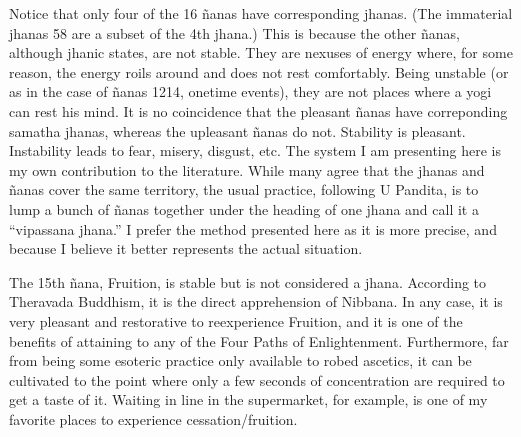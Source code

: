\documentclass[a5paper,10pt,english]{book}
\begin{document}
\sphinxAtStartPar
Notice that only four of the 16 ñanas have corresponding jhanas. (The
immaterial jhanas 5\sphinxhyphen{}8 are a subset of the 4th jhana.) This is because
the other ñanas, although jhanic states, are not stable. They are
nexuses of energy where, for some reason, the energy roils around and
does not rest comfortably. Being unstable (or as in the case of ñanas
12\sphinxhyphen{}14, one\sphinxhyphen{}time events), they are not places where a yogi can rest his
mind. It is no coincidence that the pleasant ñanas have correponding
samatha jhanas, whereas the upleasant ñanas do not. Stability is
pleasant. Instability leads to fear, misery, disgust, etc. The system I
am presenting here is my own contribution to the literature. While many
agree that the jhanas and ñanas cover the same territory, the usual
practice, following U Pandita, is to lump a bunch of ñanas together
under the heading of one jhana and call it a “vipassana jhana.” I prefer
the method presented here as it is more precise, and because I believe
it better represents the actual situation.

\sphinxAtStartPar
The 15th ñana, Fruition, is stable but is not considered a jhana.
According to Theravada Buddhism, it is the direct apprehension of
Nibbana. In any case, it is very pleasant and restorative to
re\sphinxhyphen{}experience Fruition, and it is one of the benefits of attaining to
any of the Four Paths of Enlightenment. Furthermore, far from being some
esoteric practice only available to robed ascetics, it can be cultivated
to the point where only a few seconds of concentration are required to
get a taste of it. Waiting in line in the supermarket, for example, is
one of my favorite places to experience cessation/fruition.
\end{document}
